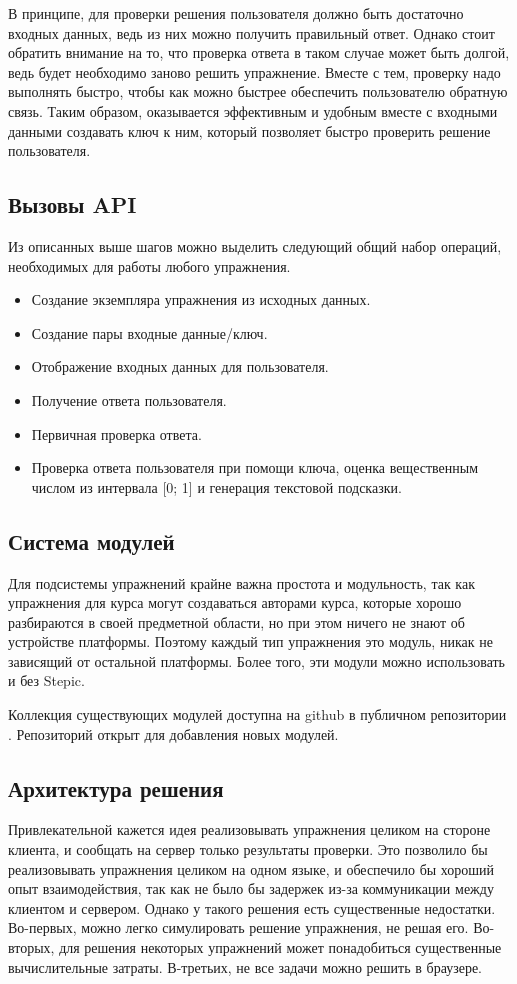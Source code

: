 \documentclass{matmex-diploma-custom}
\begin{document}
В принципе, для проверки решения пользователя должно быть достаточно
входных данных, ведь из них можно получить правильный ответ. Однако
стоит обратить внимание на то, что проверка ответа в таком случае
может быть долгой, ведь будет необходимо заново решить
упражнение. Вместе с тем, проверку надо выполнять быстро, чтобы как
можно быстрее обеспечить пользователю обратную связь. Таким образом,
оказывается эффективным и удобным вместе с входными данными создавать
ключ к ним, который позволяет быстро проверить решение пользователя.

\subsection{Вызовы API}
Из описанных выше шагов можно выделить следующий общий набор операций,
необходимых для работы любого упражнения.

\begin{itemize}
\item Создание экземпляра упражнения из исходных данных.
\item Создание пары входные данные/ключ.
\item Отображение входных данных для пользователя.
\item Получение ответа пользователя.
\item Первичная проверка ответа.
\item Проверка ответа пользователя при помощи ключа, оценка
  вещественным числом из интервала [0; 1] и генерация текстовой подсказки.
\end{itemize}

\subsection{Система модулей}
Для подсистемы упражнений крайне важна простота и модульность, так как
упражнения для курса могут создаваться авторами курса, которые хорошо
разбираются в своей предметной области, но при этом ничего не знают об
устройстве платформы. Поэтому каждый тип упражнения это модуль, никак
не зависящий от остальной платформы. Более того, эти модули можно
использовать и без Stepic.

Коллекция существующих модулей доступна на github в публичном
репозитории \cite{plugins:repo}. Репозиторий открыт для добавления
новых модулей.

\subsection{Архитектура решения}
Привлекательной кажется идея реализовывать упражнения целиком на
стороне клиента, и сообщать на сервер только результаты проверки. Это
позволило бы реализовывать упражнения целиком на одном языке, и
обеспечило бы хороший опыт взаимодействия, так как не было бы задержек
из-за коммуникации между клиентом и сервером. Однако у такого решения
есть существенные недостатки. Во-первых, можно легко симулировать
решение упражнения, не решая его. Во-вторых, для решения некоторых
упражнений может понадобиться существенные вычислительные
затраты. В-третьих, не все задачи можно решить в браузере.
\end{document}
